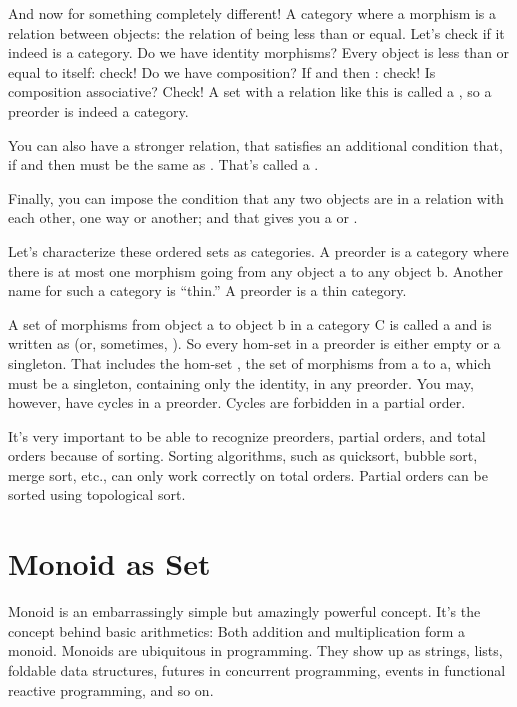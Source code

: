 And now for something completely different! A category where a morphism
is a relation between objects: the relation of being less than or equal.
Let's check if it indeed is a category. Do we have identity morphisms?
Every object is less than or equal to itself: check! Do we have
composition? If  and  then : check! Is composition associative? Check! A set with a
relation like this is called a , so a preorder is indeed
a category.

You can also have a stronger relation, that satisfies an additional
condition that, if  and  then  must be
the same as . That's called a .

Finally, you can impose the condition that any two objects are in a
relation with each other, one way or another; and that gives you a
 or .

Let's characterize these ordered sets as categories. A preorder is a
category where there is at most one morphism going from any object a to
any object b. Another name for such a category is ``thin.'' A preorder
is a thin category.

A set of morphisms from object a to object b in a category C is called a
 and is written as  (or, sometimes,
). So every hom-set in a preorder is either
empty or a singleton. That includes the hom-set , the set of
morphisms from a to a, which must be a singleton, containing only the
identity, in any preorder. You may, however, have cycles in a preorder.
Cycles are forbidden in a partial order.

It's very important to be able to recognize preorders, partial orders,
and total orders because of sorting. Sorting algorithms, such as
quicksort, bubble sort, merge sort, etc., can only work correctly on
total orders. Partial orders can be sorted using topological sort.

\section{Monoid as Set}\label{monoid-as-set}

Monoid is an embarrassingly simple but amazingly powerful concept. It's
the concept behind basic arithmetics: Both addition and multiplication
form a monoid. Monoids are ubiquitous in programming. They show up as
strings, lists, foldable data structures, futures in concurrent
programming, events in functional reactive programming, and so on.


